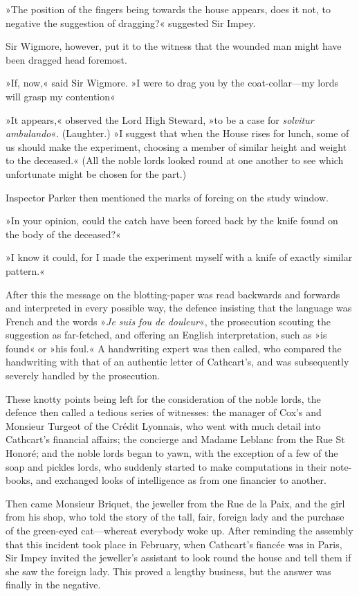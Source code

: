 »The position of the fingers being towards the house appears, does it not, to negative the suggestion of dragging?« suggested Sir Impey.

Sir Wigmore, however, put it to the witness that the wounded man might have been dragged head foremost.

»If, now,« said Sir Wigmore. »I were to drag you by the coat-collar\allowbreak---\allowbreak my lords will grasp my contention\longdash«

»It appears,« observed the Lord High Steward, »to be a case for \textit{solvitur ambulando}«. (Laughter.) »I suggest that when the House rises for lunch, some of us should make the experiment, choosing a member of similar height and weight to the deceased.« (All the noble lords looked round at one another to see which unfortunate might be chosen for the part.)

Inspector Parker then mentioned the marks of forcing on the study window.

»In your opinion, could the catch have been forced back by the knife found on the body of the deceased?«

»I know it could, for I made the experiment myself with a knife of exactly similar pattern.«

After this the message on the blotting-paper was read backwards and forwards and interpreted in every possible way, the defence insisting that the language was French and the words »\textit{Je suis fou de douleur}«, the prosecution scouting the suggestion as far-fetched, and offering an English interpretation, such as »is found« or »his foul.« A handwriting expert was then called, who compared the handwriting with that of an authentic letter of Cathcart's, and was subsequently severely handled by the prosecution.

These knotty points being left for the consideration of the noble lords, the defence then called a tedious series of witnesses: the manager of Cox's and Monsieur Turgeot of the Crédit Lyonnais, who went with much detail into Cathcart's financial affairs; the concierge and Madame Leblanc from the Rue St Honoré; and the noble lords began to yawn, with the exception of a few of the soap and pickles lords, who suddenly started to make computations in their note-books, and exchanged looks of intelligence as from one financier to another.

Then came Monsieur Briquet, the jeweller from the Rue de la Paix, and the girl from his shop, who told the story of the tall, fair, foreign lady and the purchase of the green-eyed cat\allowbreak---\allowbreak whereat everybody woke up.  After reminding the assembly that this incident took place in February, when Cathcart's fiancée was in Paris, Sir Impey invited the jeweller's assistant to look round the house and tell them if she saw the foreign lady. This proved a lengthy business, but the answer was finally in the negative.


